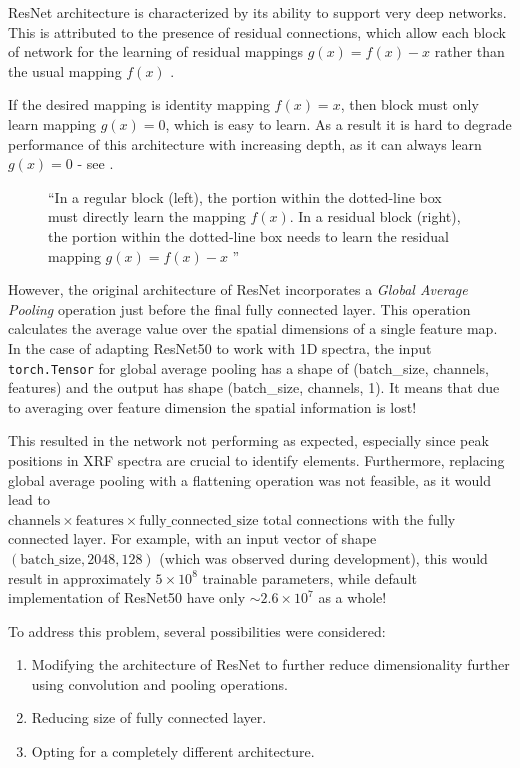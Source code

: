 ResNet architecture is characterized by its ability to support very deep networks. This is attributed to the presence of residual connections, which allow each block of network for the learning of residual mappings $g(x) = f(x) - x$ rather than the usual mapping $f(x)$ \cite{d2lResnet}. 

If the desired mapping is identity mapping $f(x) = x$, then block must only learn mapping $g(x) = 0$, which is easy to learn. 
As a result it is hard to degrade performance of this architecture with increasing depth, as it can always learn $g(x) = 0$ - see .

\begin{figure}[h] 
  \centering     
   
  \caption{``In a regular block (left), the portion within the dotted-line box must directly learn the mapping $f(x)$. 
  In a residual block (right), the portion within the dotted-line box needs to learn the residual mapping $g(x) = f(x) - x$ \cite{d2lResnet}''}
  \label{fig:residual-block}
\end{figure}

However, the original architecture of ResNet incorporates a \emph{Global Average Pooling} operation just before the final fully connected layer. 
This operation calculates the average value over the spatial dimensions of a single feature map. 
In the case of adapting ResNet50 to work with 1D spectra, the input \texttt{torch.Tensor} for global average pooling has a shape of (batch\_size, channels, features) and the output has shape (batch\_size, channels, 1). 
It means that due to averaging over feature dimension the spatial information is lost!

This resulted in the network not performing as expected, especially since peak positions in XRF spectra are crucial to identify elements. 
Furthermore, replacing global average pooling with a flattening operation was not feasible, as it would lead to \\ $\text{{channels}} \times \text{{features}} \times \text{{fully\_connected\_size}}$ total connections with the fully connected layer. 
For example, with an input vector of shape $(\text{{batch\_size}}, 2048, 128)$ (which was observed during development), this would result in approximately $5 \times 10^{8}$ trainable parameters, while default implementation of ResNet50 have only $\sim2.6 \times 10^7$ as a whole!

To address this problem, several possibilities were considered:
\begin{enumerate}
    \item Modifying the architecture of ResNet to further reduce dimensionality further using convolution and pooling operations.
    \item Reducing size of fully connected layer.
    \item Opting for a completely different architecture.
\end{enumerate}

